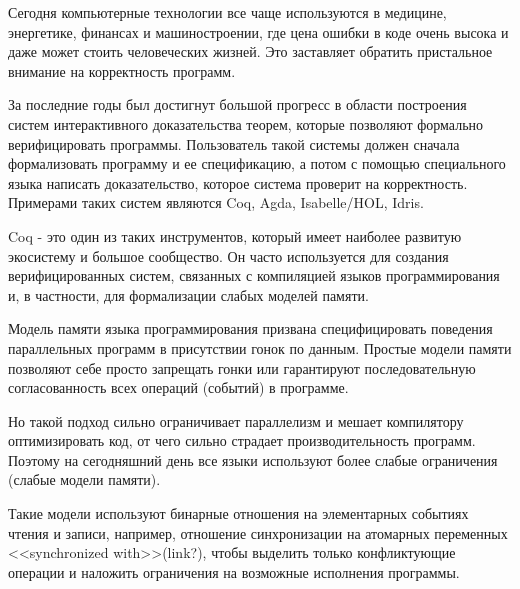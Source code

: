 \documentclass[times
              ]{itmo-student-thesis}
\begin{document}

\tableofcontents

\startprefacepage



  Сегодня компьютерные технологии все чаще используются в медицине, энергетике, финансах и
  машиностроении, где цена ошибки в коде очень высока и даже может стоить человеческих жизней.
  Это заставляет обратить пристальное внимание на корректность программ.

  За последние годы был достигнут большой прогресс в области построения систем интерактивного
  доказательства теорем, которые позволяют формально верифицировать программы.
  Пользователь такой системы должен сначала формализовать программу и ее спецификацию, а потом с помощью
  специального языка написать доказательство, которое система проверит на корректность.
  Примерами таких систем являются Coq\cite{intro_to_coq}, Agda, Isabelle/HOL, Idris.

  Coq - это один из таких инструментов, который имеет наиболее развитую экосистему и большое сообщество.
  Он часто используется для создания верифицированных систем, связанных с компиляцией языков
  программирования\cite{comp-cert, vellvm} и, в частности, для формализации слабых моделей
  памяти\cite{rc11, imm}.

  Модель памяти языка программирования призвана специфицировать поведения параллельных программ в
  присутствии гонок по данным.
  Простые модели памяти позволяют себе просто запрещать гонки или гарантируют последовательную
  согласованность всех операций (событий) в программе.

  Но такой подход сильно ограничивает параллелизм и мешает компилятору оптимизировать код, от чего сильно
  страдает производительность программ.
  Поэтому на сегодняшний день все языки используют более слабые ограничения (слабые модели памяти).

  Такие модели используют бинарные отношения на элементарных событиях чтения и записи, например,
  отношение синхронизации на атомарных переменных <<synchronized with>>(link?), чтобы выделить только
  конфликтующие операции и наложить ограничения на возможные исполнения программы.
\end{document}

